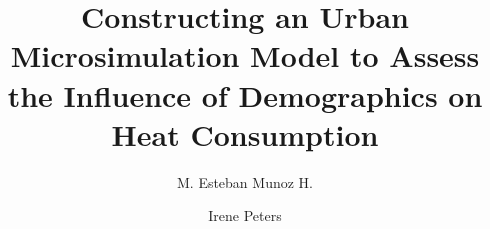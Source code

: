 \documentclass[11pt]{IJM-article}
\begin{document}

\title{
Constructing an Urban Microsimulation Model to Assess the Influence of
Demographics on Heat Consumption}
 

\author[Munoz]{M. Esteban Munoz H.}
\address{Technical Urban Infrastructure Systems Group, HafenCity University\\
         Hamburg, Germany}

\author[Peters]{Irene Peters}
\address{Technical Urban Infrastructure Systems Group, HafenCity University\\
         Hamburg, Germany}





\end{document}
